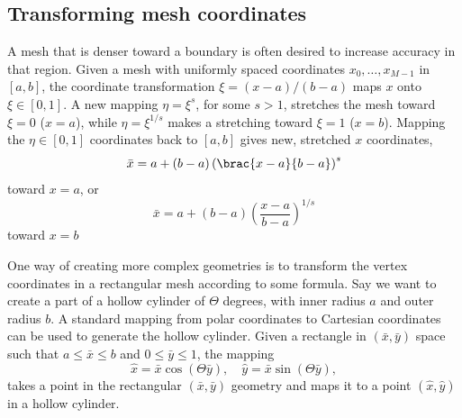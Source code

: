\subsection{Transforming mesh coordinates}
\label{langtangen:mesh:transform:cyl}

A mesh that is denser toward a boundary is often desired to increase
accuracy in that region. Given a mesh with uniformly spaced
coordinates $x_0,\ldots,x_{M-1}$ in $[a,b]$, the coordinate transformation
$\xi = (x-a)/(b-a)$ maps $x$ onto $\xi\in [0,1]$. A new mapping
$\eta = \xi^s$, for some $s>1$, stretches the mesh toward $\xi=0$ ($x=a$),
while $\eta = \xi^{1/s}$ makes a stretching toward $\xi=1$ ($x=b$).
Mapping the $\eta\in[0,1]$ coordinates back to $[a,b]$ gives new,
stretched $x$ coordinates,
\begin{equation}
\bar x = a + (b-a)\left( \brac{x-a}{b-a}\right)^s
\end{equation}
toward $x=a$, or
\begin{equation}
\bar x = a + (b-a)\left(\frac{x-a}{b-a}\right)^{1/s}
\end{equation}
toward $x=b$

One way of creating more complex geometries is to transform the
vertex coordinates in a rectangular mesh according to some formula.
Say we want to create a part of a hollow cylinder of $\Theta$ degrees,
with inner radius $a$ and outer radius $b$. A standard mapping from polar
coordinates to Cartesian coordinates can be used to generate the
hollow cylinder. Given a rectangle in $(\bar x, \bar y)$ space such that
$a\leqslant \bar x\leqslant b$ and $0\leqslant \bar y\leqslant 1$, the mapping
\[ \hat x = \bar x\cos (\Theta \bar y),\quad \hat y = \bar x\sin (\Theta \bar y),\]
takes a point in the rectangular $(\bar x,\bar y)$
geometry and maps it to a point
$(\hat x, \hat y)$ in a hollow cylinder.

